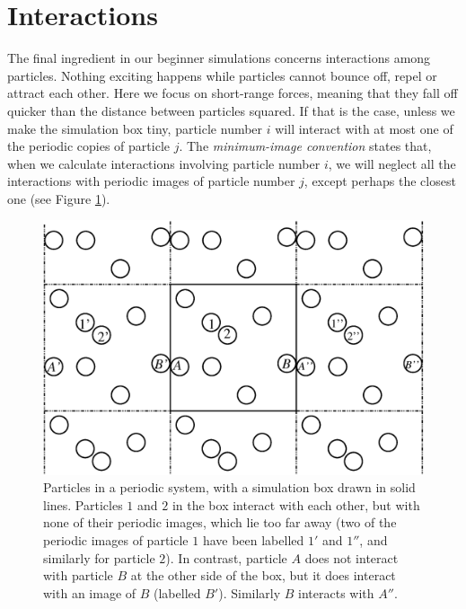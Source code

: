\section{Interactions}

The final ingredient in our beginner simulations concerns interactions among 
particles. Nothing exciting happens while particles cannot bounce off, repel or 
attract each other. Here we focus on short-range forces, meaning that they fall 
off quicker than the distance between particles squared. If that is the case, 
unless we make the simulation box tiny, particle number $i$ will interact with 
at most one of the periodic copies of particle $j$. The \textit{minimum-image 
convention} states that, when we calculate interactions involving particle 
number $i$, we will neglect all the interactions with periodic images of 
particle number $j$, except perhaps the closest one (see Figure 
\ref{minimum-image_convention}).

\begin{figure}
  \centering
  \includegraphics[width = \textwidth]{figures/minimum-image_convention.eps}
  \caption{\label{minimum-image_convention}Particles in a periodic system, with
           a simulation box drawn in solid lines. Particles $1$ and $2$ in the
           box interact with each other, but with none of their periodic images,
           which lie too far away (two of the periodic images of particle $1$
           have been labelled $1'$ and $1''$, and similarly for particle $2$).
           In contrast, particle $A$ does not interact with particle $B$ at the
           other side of the box, but it does interact with an image of $B$
           (labelled $B'$). Similarly $B$ interacts with $A''$.}
\end{figure}

